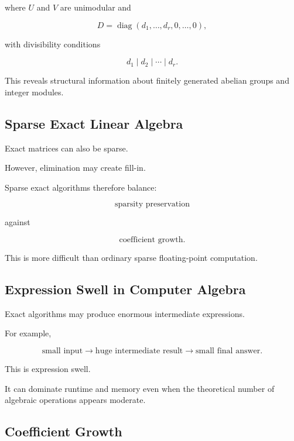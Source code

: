 where \(U\) and \(V\) are unimodular and

\[
\boxed{
D
=
\operatorname{diag}
(
d_1,\ldots,d_r,0,\ldots,0
),
}
\]

with divisibility conditions

\[
\boxed{
d_1\mid d_2\mid\cdots\mid d_r.
}
\]

This reveals structural information about finitely generated abelian
groups and integer modules.

\subsection{Sparse Exact Linear Algebra}
\label{subsec:sparse-exact-linear-algebra}

Exact matrices can also be sparse.

However, elimination may create fill-in.

Sparse exact algorithms therefore balance:

\[
\boxed{
\text{sparsity preservation}
}
\]

against

\[
\boxed{
\text{coefficient growth}.
}
\]

This is more difficult than ordinary sparse floating-point computation.

\subsection{Expression Swell in Computer Algebra}
\label{subsec:computer-algebra-expression-swell}

Exact algorithms may produce enormous intermediate expressions.

For example,

\[
\boxed{
\text{small input}
\longrightarrow
\text{huge intermediate result}
\longrightarrow
\text{small final answer}.
}
\]

This is expression swell.

It can dominate runtime and memory even when the theoretical number of
algebraic operations appears moderate.

\subsection{Coefficient Growth}
\label{subsec:computer-algebra-coefficient-growth}

